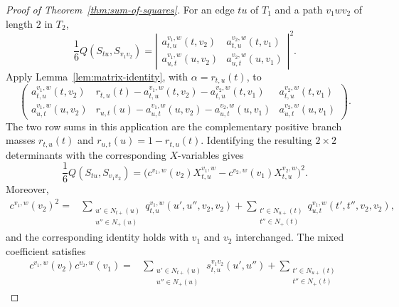 \documentclass[12pt]{article}
\begin{document}
\begin{proof}[Proof of Theorem~\ref{thm:sum-of-squares}]
For an edge $tu$ of $T_1$ and a path $v_1wv_2$ of length $2$ in $T_2$,
\begin{equation}\label{eq:display-029}
\frac16Q(S_{tu},S_{v_1v_2})=
\left|
\begin{matrix}
a_{t,u}^{v_1,w}(t,v_2)&a_{t,u}^{v_2,w}(t,v_1)\\
a_{u,t}^{v_1,w}(u,v_2)&a_{u,t}^{v_2,w}(u,v_1)
\end{matrix}
\right|^2.
\end{equation}
Apply Lemma~\ref{lem:matrix-identity}, with $\alpha=r_{t,u}(t)$, to
\begingroup
\small
\setlength{\arraycolsep}{12pt}
\renewcommand{\arraystretch}{1.12}
\begin{equation}\label{eq:display-030}
\begin{pmatrix}
a_{t,u}^{v_1,w}(t,v_2)&
r_{t,u}(t)-a_{t,u}^{v_1,w}(t,v_2)-a_{t,u}^{v_2,w}(t,v_1)&
a_{t,u}^{v_2,w}(t,v_1)\\
a_{u,t}^{v_1,w}(u,v_2)&
r_{u,t}(u)-a_{u,t}^{v_1,w}(u,v_2)-a_{u,t}^{v_2,w}(u,v_1)&
a_{u,t}^{v_2,w}(u,v_1)
\end{pmatrix}.
\end{equation}
\endgroup
The two row sums in this application are the complementary positive branch
masses $r_{t,u}(t)$ and $r_{u,t}(u)=1-r_{t,u}(t)$.  Identifying the resulting
$2\times2$ determinants with the corresponding $X$-variables gives
\begin{equation}
\frac16Q(S_{tu},S_{v_1v_2})
=\bigl(c^{v_1,w}(v_2)X_{t,u}^{v_1,w}
-c^{v_2,w}(v_1)X_{t,u}^{v_2,w}\bigr)^2.          \label{eq:edge-path-square}
\end{equation}
Moreover,
\begin{equation}\label{eq:display-031}
\begin{aligned}
c^{v_1,w}(v_2)^2
={}&\sum_{\substack{u'\in N_{t+}(u)\\u''\in N_+(u)}}
q_{t,u}^{v_1,w}(u',u'',v_2,v_2)
+\sum_{\substack{t'\in N_{u+}(t)\\t''\in N_+(t)}}
q_{u,t}^{v_1,w}(t',t'',v_2,v_2),
\end{aligned}
\end{equation}
and the corresponding identity holds with $v_1$ and $v_2$ interchanged.
The mixed coefficient satisfies
\begin{equation}\label{eq:display-032}
\begin{aligned}
c^{v_1,w}(v_2)c^{v_2,w}(v_1)
={}&\sum_{\substack{u'\in N_{t+}(u)\\u''\in N_+(u)}}
s_{t,u}^{v_1v_2}(u',u'')
+\sum_{\substack{t'\in N_{u+}(t)\\t''\in N_+(t)}}

\end{aligned}
\end{equation}
\end{proof}
\end{document}
